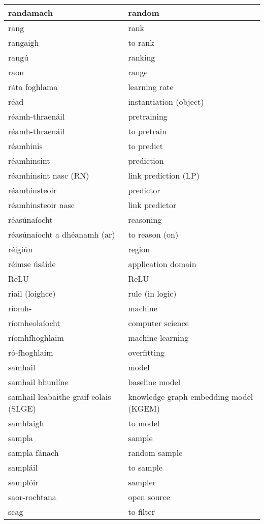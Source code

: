 \begin{longtable}{|l|l|}
		randamach&random\\ \hline 
		rang&rank\\ \hline 
		rangaigh&to rank\\ \hline 
		rangú&ranking\\ \hline 
		raon&range\\ \hline 
		ráta foghlama&learning rate\\ \hline 
		réad&instantiation (object)\\ \hline 
		réamh-thraenáil&pretraining\\ \hline 
		réamh-thraenáil&to pretrain\\ \hline 
		réamhinis&to predict\\ \hline 
		réamhinsint&prediction\\ \hline 
		réamhinsint nasc (RN)&link prediction (LP)\\ \hline 
		réamhinsteoir&predictor\\ \hline 
		réamhinsteoir nasc&link predictor\\ \hline 
		réasúnaíocht&reasoning\\ \hline 
		réasúnaíocht a dhéanamh (ar)&to reason (on)\\ \hline 
		réigiún&region\\ \hline 
		réimse úsáide&application domain\\ \hline 
		ReLU&ReLU\\ \hline 
		riail (loighce)&rule (in logic)\\ \hline 
		ríomh-&machine\\ \hline 
		ríomheolaíocht&computer science\\ \hline 
		ríomhfhoghlaim&machine learning\\ \hline 
		ró-fhoghlaim&overfitting\\ \hline 
		samhail&model\\ \hline 
		samhail bhunlíne&baseline model\\ \hline 
		samhail leabaithe graif eolais (SLGE)&knowledge graph embedding model (KGEM)\\ \hline 
		samhlaigh&to model\\ \hline 
		sampla&sample\\ \hline 
		sampla fánach&random sample\\ \hline 
		sampláil&to sample\\ \hline 
		samplóir&sampler\\ \hline 
		saor-rochtana&open source\\ \hline 
		scag&to filter\\ \hline 

\end{longtable}
